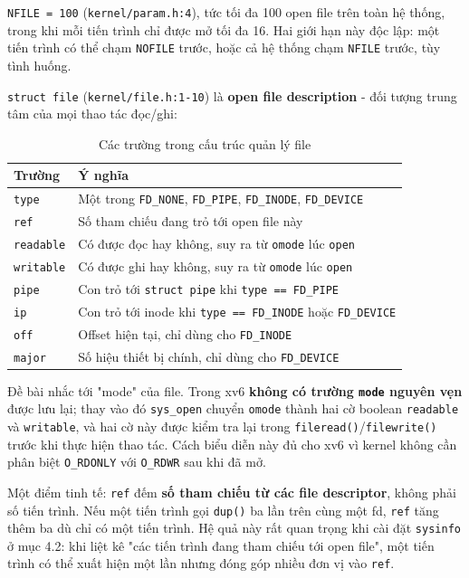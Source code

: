 \texttt{NFILE = 100} (\texttt{kernel/param.h:4}), tức tối đa 100 open file trên toàn hệ thống, trong khi mỗi tiến trình chỉ được mở tối đa 16. Hai giới hạn này độc lập: một tiến trình có thể chạm \texttt{NOFILE} trước, hoặc cả hệ thống chạm \texttt{NFILE} trước, tùy tình huống.

\texttt{struct file} (\texttt{kernel/file.h:1-10}) là \textbf{open file description} - đối tượng trung tâm của mọi thao tác đọc/ghi:

\begin{table}[H]
\centering
\renewcommand{\arraystretch}{1.3}
\setlength{\tabcolsep}{8pt}
\begin{tabular}{|l|p{12cm}|}
\hline
\rowcolor[rgb]{0.8, 0.9, 1.0}
\textbf{Trường} & \textbf{Ý nghĩa} \\ \hline
\texttt{type} & Một trong \texttt{FD\_NONE}, \texttt{FD\_PIPE}, \texttt{FD\_INODE}, \texttt{FD\_DEVICE} \\ \hline
\texttt{ref} & Số tham chiếu đang trỏ tới open file này \\ \hline
\texttt{readable} & Có được đọc hay không, suy ra từ \texttt{omode} lúc \texttt{open} \\ \hline
\texttt{writable} & Có được ghi hay không, suy ra từ \texttt{omode} lúc \texttt{open} \\ \hline
\texttt{pipe} & Con trỏ tới \texttt{struct pipe} khi \texttt{type == FD\_PIPE} \\ \hline
\texttt{ip} & Con trỏ tới inode khi \texttt{type == FD\_INODE} hoặc \texttt{FD\_DEVICE} \\ \hline
\texttt{off} & Offset hiện tại, chỉ dùng cho \texttt{FD\_INODE} \\ \hline
\texttt{major} & Số hiệu thiết bị chính, chỉ dùng cho \texttt{FD\_DEVICE} \\ \hline
\end{tabular}
\caption{Các trường trong cấu trúc quản lý file}
\end{table}

Đề bài nhắc tới "mode" của file. Trong xv6 \textbf{không có trường \texttt{mode} nguyên vẹn} được lưu lại; thay vào đó \texttt{sys\_open} chuyển \texttt{omode} thành hai cờ boolean \texttt{readable} và \texttt{writable}, và hai cờ này được kiểm tra lại trong \texttt{fileread()}/\texttt{filewrite()} trước khi thực hiện thao tác. Cách biểu diễn này đủ cho xv6 vì kernel không cần phân biệt \texttt{O\_RDONLY} với \texttt{O\_RDWR} sau khi đã mở.

Một điểm tinh tế: \texttt{ref} đếm \textbf{số tham chiếu từ các file descriptor}, không phải số tiến trình. Nếu một tiến trình gọi \texttt{dup()} ba lần trên cùng một fd, \texttt{ref} tăng thêm ba dù chỉ có một tiến trình. Hệ quả này rất quan trọng khi cài đặt \texttt{sysinfo} ở mục 4.2: khi liệt kê "các tiến trình đang tham chiếu tới open file", một tiến trình có thể xuất hiện một lần nhưng đóng góp nhiều đơn vị vào \texttt{ref}.

